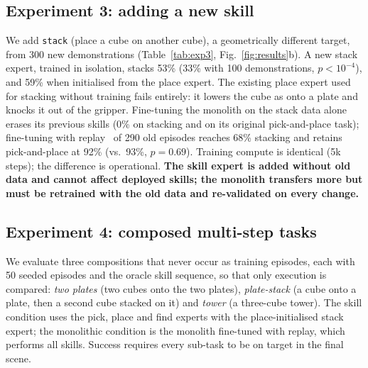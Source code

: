 \documentclass[conference]{IEEEtran}
\begin{document}
\subsection{Experiment 3: adding a new skill}\label{sec:exp3}
We add \texttt{stack} (place a cube on another cube), a geometrically different target, from 300 new
demonstrations (Table~\ref{tab:exp3}, Fig.~\ref{fig:results}b). A new stack expert, trained in isolation, stacks 53\% (33\% with 100
demonstrations, $p<10^{-4}$), and 59\% when initialised from the place expert. The existing place expert used
for stacking without training fails entirely: it lowers the cube as onto a plate and knocks it out of the
gripper. Fine-tuning the monolith on the stack data alone erases its previous skills (0\% on stacking and on its
original pick-and-place task); fine-tuning with replay~\cite{rolnick2019replay} of 290 old episodes reaches 68\% stacking and retains
pick-and-place at 92\% (vs.\ 93\%, $p=0.69$). Training compute is identical (5k steps); the difference is
operational. \textbf{The skill expert is added without old data and cannot affect deployed skills; the monolith
transfers more but must be retrained with the old data and re-validated on every change.}

\begin{table}[t]
\centering\small
\caption{Experiment 3: adding \texttt{stack} (150 paired episodes; 5k training steps where trained).}
\label{tab:exp3}
\end{table}

\subsection{Experiment 4: composed multi-step tasks}\label{sec:exp4}
We evaluate three compositions that never occur as training episodes, each with 50 seeded episodes and the oracle
skill sequence, so that only execution is compared: \emph{two plates} (two cubes onto the two plates),
\emph{plate-stack} (a cube onto a plate, then a second cube stacked on it) and \emph{tower} (a three-cube tower).
The skill condition uses the pick, place and find experts with the place-initialised stack expert; the monolithic
condition is the monolith fine-tuned with replay, which performs all skills. Success requires every sub-task to be
on target in the final scene.
\end{document}
